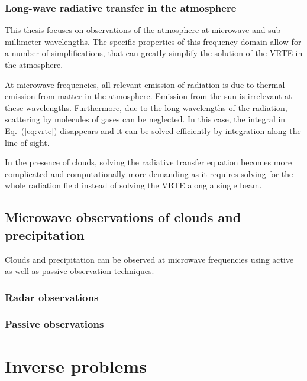 \subsection{Long-wave radiative transfer in the atmosphere}

This thesis focuses on observations of the atmosphere at microwave and sub-millimeter
wavelengths. The specific properties of this frequency domain allow for a number
of simplifications, that can greatly simplify the solution of the VRTE in
the atmosphere.

At microwave frequencies, all relevant emission of radiation is due to thermal
emission from matter in the atmosphere. Emission from the sun is irrelevant at
these wavelengths. Furthermore, due to the long wavelengths of the radiation,
scattering by molecules of gases can be neglected. In this case, the integral in
Eq.~(\ref{eq:vrte}) disappears and it can be solved efficiently by integration
along the line of sight.

In the presence of clouds, solving the radiative transfer equation becomes
more complicated and computationally more demanding as it requires solving
for the whole radiation field instead of solving the VRTE along a single
beam.

\section{Microwave observations of clouds and precipitation} 

Clouds and precipitation can be observed at microwave frequencies using
active as well as passive observation techniques.

\subsection{Radar observations}


\subsection{Passive observations}


%
\chapter{Inverse problems}
\label{ch:inverse_problems}

